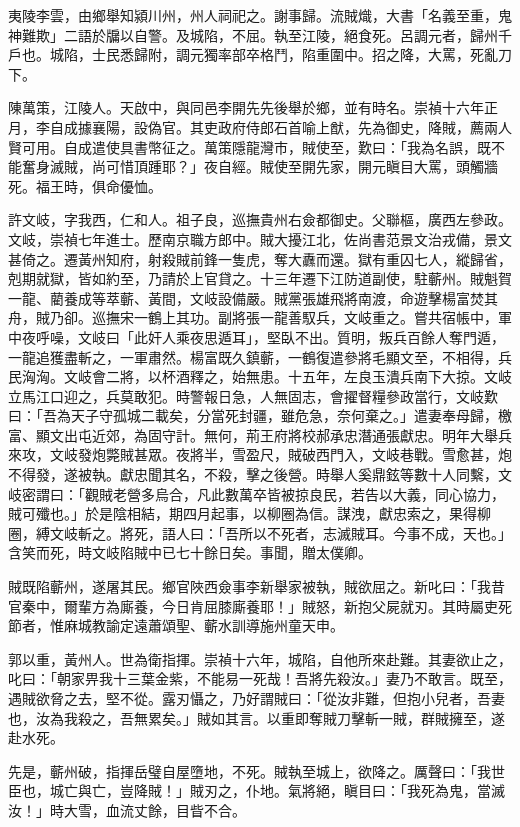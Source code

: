 \begin{pinyinscope}
夷陵李雲，由鄉舉知潁川州，州人祠祀之。謝事歸。流賊熾，大書「名義至重，鬼神難欺」二語於牖以自警。及城陷，不屈。執至江陵，絕食死。呂調元者，歸州千戶也。城陷，士民悉歸附，調元獨率部卒格鬥，陷重圍中。招之降，大罵，死亂刀下。

陳萬策，江陵人。天啟中，與同邑李開先先後舉於鄉，並有時名。崇禎十六年正月，李自成據襄陽，設偽官。其吏政府侍郎石首喻上猷，先為御史，降賊，薦兩人賢可用。自成遣使具書幣征之。萬策隱龍灣市，賊使至，歎曰：「我為名誤，既不能奮身滅賊，尚可惜頂踵耶？」夜自經。賊使至開先家，開元瞋目大罵，頭觸牆死。福王時，俱命優恤。

許文岐，字我西，仁和人。祖子良，巡撫貴州右僉都御史。父聯樞，廣西左參政。文岐，崇禎七年進士。歷南京職方郎中。賊大擾江北，佐尚書范景文治戎備，景文甚倚之。遷黃州知府，射殺賊前鋒一隻虎，奪大纛而還。獄有重囚七人，縱歸省，剋期就獄，皆如約至，乃請於上官貸之。十三年遷下江防道副使，駐蘄州。賊魁賀一龍、藺養成等萃蘄、黃間，文岐設備嚴。賊黨張雄飛將南渡，命遊擊楊富焚其舟，賊乃卻。巡撫宋一鶴上其功。副將張一龍善馭兵，文岐重之。嘗共宿帳中，軍中夜呼噪，文岐曰「此奸人乘夜思遁耳」，堅臥不出。質明，叛兵百餘人奪門遁，一龍追獲盡斬之，一軍肅然。楊富既久鎮蘄，一鶴復遣參將毛顯文至，不相得，兵民洶洶。文岐會二將，以杯酒釋之，始無患。十五年，左良玉潰兵南下大掠。文岐立馬江口迎之，兵莫敢犯。時警報日急，人無固志，會擢督糧參政當行，文岐歎曰：「吾為天子守孤城二載矣，分當死封疆，雖危急，奈何棄之。」遣妻奉母歸，檄富、顯文出屯近郊，為固守計。無何，荊王府將校郝承忠潛通張獻忠。明年大舉兵來攻，文岐發炮斃賊甚眾。夜將半，雪盈尺，賊破西門入，文岐巷戰。雪愈甚，炮不得發，遂被執。獻忠聞其名，不殺，擊之後營。時舉人奚鼎鉉等數十人同繫，文岐密謂曰：「觀賊老營多烏合，凡此數萬卒皆被掠良民，若告以大義，同心協力，賊可殲也。」於是陰相結，期四月起事，以柳圈為信。謀洩，獻忠索之，果得柳圈，縛文岐斬之。將死，語人曰：「吾所以不死者，志滅賊耳。今事不成，天也。」含笑而死，時文岐陷賊中已七十餘日矣。事聞，贈太僕卿。

賊既陷蘄州，遂屠其民。鄉官陜西僉事李新舉家被執，賊欲屈之。新叱曰：「我昔官秦中，爾輩方為廝養，今日肯屈膝廝養耶！」賊怒，新抱父屍就刃。其時屬吏死節者，惟麻城教諭定遠蕭頌聖、蘄水訓導施州童天申。

郭以重，黃州人。世為衛指揮。崇禎十六年，城陷，自他所來赴難。其妻欲止之，叱曰：「朝家畀我十三葉金紫，不能易一死哉！吾將先殺汝。」妻乃不敢言。既至，遇賊欲脅之去，堅不從。露刃懾之，乃好謂賊曰：「從汝非難，但抱小兒者，吾妻也，汝為我殺之，吾無累矣。」賊如其言。以重即奪賊刀擊斬一賊，群賊擁至，遂赴水死。

先是，蘄州破，指揮岳璧自屋墮地，不死。賊執至城上，欲降之。厲聲曰：「我世臣也，城亡與亡，豈降賊！」賊刃之，仆地。氣將絕，瞋目曰：「我死為鬼，當滅汝！」時大雪，血流丈餘，目眥不合。


\end{pinyinscope}

